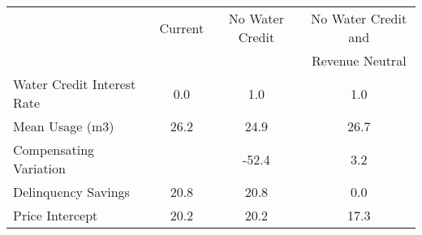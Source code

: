 \begin{tabular}{lccc}
& Current & No Water Credit & No Water Credit and \\
&         &                  & Revenue Neutral \\
Water Credit Interest Rate &0.0&1.0&1.0\\
Mean Usage (m3) &26.2&24.9&26.7\\
Compensating Variation  & &-52.4&3.2\\
Delinquency Savings  &20.8&20.8&0.0\\
Price Intercept  &20.2&20.2&17.3\\
\end{tabular} 

